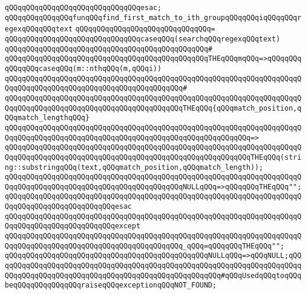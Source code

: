 \verb|qQQqqQQqqQQqqQQqqQQqqQQqqQQqqQQqesac;|\newline
\newline
\newline
\verb|qQQqqQQqqQQqqQQqfunqQQqfind_first_match_to_ith_groupqQQqqQQqiqQQqqQQqregexqQQqqQQqtext|\newline
\verb|qQQqqQQqqQQqqQQqqQQqqQQqqQQqqQQq=|\newline
\verb|qQQqqQQqqQQqqQQqqQQqqQQqqQQqqQQqcaseqQQq(searchqQQqregexqQQqtext)|\newline
\verb|qQQqqQQqqQQqqQQqqQQqqQQqqQQqqQQqqQQqqQQqqQQqqQQq#|\newline
\verb|qQQqqQQqqQQqqQQqqQQqqQQqqQQqqQQqqQQqqQQqqQQqqQQqTHEqQQqmqQQq=>qQQqqQQqqQQqqQQqcaseqQQq(m::nthqQQq(m,qQQqi))|\newline
\verb|qQQqqQQqqQQqqQQqqQQqqQQqqQQqqQQqqQQqqQQqqQQqqQQqqQQqqQQqqQQqqQQqqQQqqQQqqQQqqQQqqQQqqQQqqQQqqQQqqQQqqQQqqQQqqQQq#|\newline
\verb|qQQqqQQqqQQqqQQqqQQqqQQqqQQqqQQqqQQqqQQqqQQqqQQqqQQqqQQqqQQqqQQqqQQqqQQqqQQqqQQqqQQqqQQqqQQqqQQqqQQqqQQqqQQqqQQqTHEqQQq{qQQqmatch_position,qQQqmatch_lengthqQQq}|\newline
\verb|qQQqqQQqqQQqqQQqqQQqqQQqqQQqqQQqqQQqqQQqqQQqqQQqqQQqqQQqqQQqqQQqqQQqqQQqqQQqqQQqqQQqqQQqqQQqqQQqqQQqqQQqqQQqqQQqqQQqqQQqqQQqqQQq=>|\newline
\verb|qQQqqQQqqQQqqQQqqQQqqQQqqQQqqQQqqQQqqQQqqQQqqQQqqQQqqQQqqQQqqQQqqQQqqQQqqQQqqQQqqQQqqQQqqQQqqQQqqQQqqQQqqQQqqQQqqQQqqQQqqQQqqQQqTHEqQQq(string::substringqQQq(text,qQQqmatch_position,qQQqmatch_length));|\newline
\newline
\verb|qQQqqQQqqQQqqQQqqQQqqQQqqQQqqQQqqQQqqQQqqQQqqQQqqQQqqQQqqQQqqQQqqQQqqQQqqQQqqQQqqQQqqQQqqQQqqQQqqQQqqQQqqQQqqQQqNULLqQQq=>qQQqqQQqTHEqQQq"";|\newline
\verb|qQQqqQQqqQQqqQQqqQQqqQQqqQQqqQQqqQQqqQQqqQQqqQQqqQQqqQQqqQQqqQQqqQQqqQQqqQQqqQQqqQQqqQQqqQQqqQQqesac|\newline
\verb|qQQqqQQqqQQqqQQqqQQqqQQqqQQqqQQqqQQqqQQqqQQqqQQqqQQqqQQqqQQqqQQqqQQqqQQqqQQqqQQqqQQqqQQqqQQqqQQqexcept|\newline
\verb|qQQqqQQqqQQqqQQqqQQqqQQqqQQqqQQqqQQqqQQqqQQqqQQqqQQqqQQqqQQqqQQqqQQqqQQqqQQqqQQqqQQqqQQqqQQqqQQqqQQqqQQqqQQqqQQq_qQQq=qQQqqQQqTHEqQQq"";|\newline
\newline
\verb|qQQqqQQqqQQqqQQqqQQqqQQqqQQqqQQqqQQqqQQqqQQqqQQqNULLqQQq=>qQQqNULL;qQQqqQQqqQQqqQQqqQQqqQQqqQQqqQQqqQQqqQQqqQQqqQQqqQQqqQQqqQQqqQQqqQQqqQQqqQQqqQQqqQQqqQQqqQQqqQQqqQQqqQQqqQQqqQQqqQQqqQQqqQQq#qQQqUsedqQQqtoqQQqbeqQQqqQQqqQQqqQQqraiseqQQqexceptionqQQqNOT_FOUND;|\newline
